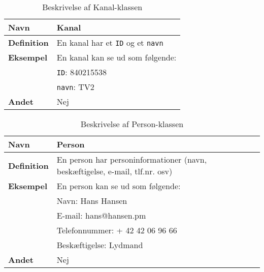 \begin{table}[H]
    \begin{tabularx}{\textwidth}{|p{3cm}|X|}
        \hline
        \textbf{Navn} &  Kanal\\
        \hline
        \textbf{Definition} & En kanal har et \texttt{ID} og et \texttt{navn}\\
        \hline
        \textbf{Eksempel} & En kanal kan se ud som følgende: \\
                          & \texttt{ID}: 840215538\\
                          & \texttt{navn}: TV2\\
        \hline
        \textbf{Andet} & Nej\\
        \hline
    \end{tabularx}
    \caption{Beskrivelse af Kanal-klassen}
    \label{tab:channel_class_description}
\end{table}

\begin{table}[H]
    \begin{tabularx}{\textwidth}{|p{3cm}|X|}
        \hline
        \textbf{Navn} &  Person\\
        \hline
        \textbf{Definition} &  En person har personinformationer (navn, beskæftigelse, e-mail, tlf.nr. osv)\\
        \hline
        \textbf{Eksempel} & En person kan se ud som følgende: \\
                          & Navn: Hans Hansen\\
                          & E-mail: hans@hansen.pm\\
                          & Telefonnummer: + 42 42 06 96 66\\
                          & Beskæftigelse: Lydmand\\
        \hline
        \textbf{Andet} & Nej\\
        \hline
    \end{tabularx}
    \caption{Beskrivelse af Person-klassen}
    \label{tab:person_class_description}
\end{table}